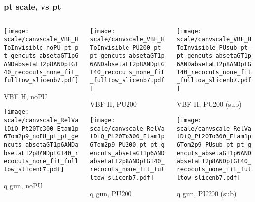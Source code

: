 \documentclass[8pt]{beamer}
\begin{document}
 \begin{frame}
  \frametitle{pt scale, vs pt}
  
  \begin{columns}
   \begin{column}{0.35\textwidth}
     \texttt{[image: scale/canvscale\_VBF\_HToInvisible\_noPU\_pt\_pt\_gencuts\_absetaGT1p6ANDabsetaLT2p8ANDptGT40\_recocuts\_none\_fit\_fulltow\_slicenb7.pdf]}
     
     VBF H, noPU
    
     \texttt{[image: scale/canvscale\_RelValDiQ\_Pt20To300\_Etam1p6Tom2p9\_noPU\_pt\_pt\_gencuts\_absetaGT1p6ANDabsetaLT2p8ANDptGT40\_recocuts\_none\_fit\_fulltow\_slicenb7.pdf]}
     
     q gun, noPU
   \end{column}
   \begin{column}{0.35\textwidth}
     \texttt{[image: scale/canvscale\_VBF\_HToInvisible\_PU200\_pt\_pt\_gencuts\_absetaGT1p6ANDabsetaLT2p8ANDptGT40\_recocuts\_none\_fit\_fulltow\_slicenb7.pdf]}
     
     VBF H, PU200
    
     \texttt{[image: scale/canvscale\_RelValDiQ\_Pt20To300\_Etam1p6Tom2p9\_PU200\_pt\_pt\_gencuts\_absetaGT1p6ANDabsetaLT2p8ANDptGT40\_recocuts\_none\_fit\_fulltow\_slicenb7.pdf]}
     
     q gun, PU200
   \end{column}
   \begin{column}{0.35\textwidth}
     \texttt{[image: scale/canvscale\_VBF\_HToInvisible\_PUsub\_pt\_pt\_gencuts\_absetaGT1p6ANDabsetaLT2p8ANDptGT40\_recocuts\_none\_fit\_fulltow\_slicenb7.pdf]}
     
     VBF H, PU200 (sub)
    
     \texttt{[image: scale/canvscale\_RelValDiQ\_Pt20To300\_Etam1p6Tom2p9\_PUsub\_pt\_pt\_gencuts\_absetaGT1p6ANDabsetaLT2p8ANDptGT40\_recocuts\_none\_fit\_fulltow\_slicenb7.pdf]}
     
     q gun, PU200 (sub)
   \end{column}
  \end{columns}
 \end{frame}
 
\end{document}
